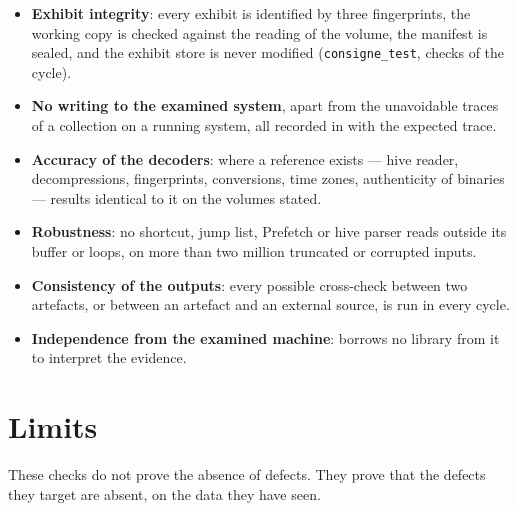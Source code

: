 \documentclass[11pt,a4paper,oneside]{report}
\begin{document}
\begin{itemize}
  \item \textbf{Exhibit integrity}: every exhibit is identified by three
    fingerprints, the working copy is checked against the reading of the
    volume, the manifest is sealed, and the exhibit store is never modified
    (\texttt{consigne\_test}, checks of the cycle).
  \item \textbf{No writing to the examined system}, apart from the unavoidable
    traces of a collection on a running system, all recorded in
     with the expected trace.
  \item \textbf{Accuracy of the decoders}: where a reference exists — hive
    reader, decompressions, fingerprints, conversions, time zones, authenticity
    of binaries — results identical to it on the volumes stated.
  \item \textbf{Robustness}: no shortcut, jump list, Prefetch or hive parser
    reads outside its buffer or loops, on more than two million truncated or
    corrupted inputs.
  \item \textbf{Consistency of the outputs}: every possible cross-check
    between two artefacts, or between an artefact and an external source, is
    run in every cycle.
  \item \textbf{Independence from the examined machine}: \wac{} borrows no
    library from it to interpret the evidence.
\end{itemize}

\section{Limits}

\begin{attention}
These checks do not prove the absence of defects. They prove that the defects
they target are absent, on the data they have seen.
\end{attention}
\end{document}
